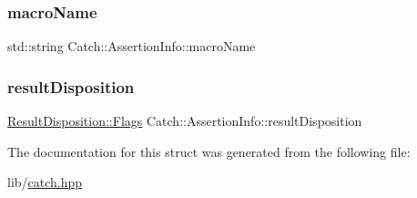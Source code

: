\hypertarget{struct_catch_1_1_assertion_info_ac2e59e8c89e00eb3390768f50d540b18}{}\label{struct_catch_1_1_assertion_info_ac2e59e8c89e00eb3390768f50d540b18} 
\subsubsection{\texorpdfstring{macro\+Name}{macroName}}
{\footnotesize\ttfamily std\+::string Catch\+::\+Assertion\+Info\+::macro\+Name}

\hypertarget{struct_catch_1_1_assertion_info_a60353b3632ab2f827162f2b2d6911073}{}\label{struct_catch_1_1_assertion_info_a60353b3632ab2f827162f2b2d6911073} 
\subsubsection{\texorpdfstring{result\+Disposition}{resultDisposition}}
{\footnotesize\ttfamily \hyperlink{struct_catch_1_1_result_disposition_a3396cad6e2259af326b3aae93e23e9d8}{Result\+Disposition\+::\+Flags} Catch\+::\+Assertion\+Info\+::result\+Disposition}



The documentation for this struct was generated from the following file\+:\begin{DoxyCompactItemize}
\item 
lib/\hyperlink{catch_8hpp}{catch.\+hpp}\end{DoxyCompactItemize}
